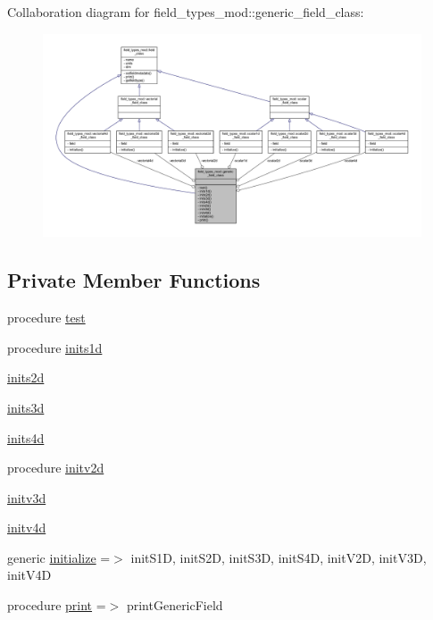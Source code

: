 Collaboration diagram for field\+\_\+types\+\_\+mod\+:\+:generic\+\_\+field\+\_\+class\+:
\nopagebreak
\begin{figure}[H]
\begin{center}
\leavevmode
\includegraphics[width=350pt]{structfield__types__mod_1_1generic__field__class__coll__graph}
\end{center}
\end{figure}
\subsection*{Private Member Functions}
\begin{DoxyCompactItemize}
\item 
procedure \mbox{\hyperlink{structfield__types__mod_1_1generic__field__class_a1b14630d6dd71ef2baf38ba633aac892}{test}}
\item 
procedure \mbox{\hyperlink{structfield__types__mod_1_1generic__field__class_a967be57b1342ca6ebd74b9b5227f893a}{inits1d}}
\item 
\mbox{\hyperlink{structfield__types__mod_1_1generic__field__class_ac18a3be56bfc8e3ea62e1dc22f523047}{inits2d}}
\item 
\mbox{\hyperlink{structfield__types__mod_1_1generic__field__class_ac97e0b49d05017b71d103b0fd38d5a30}{inits3d}}
\item 
\mbox{\hyperlink{structfield__types__mod_1_1generic__field__class_acda5aead49c8f1d2496e0ebed4b36e91}{inits4d}}
\item 
procedure \mbox{\hyperlink{structfield__types__mod_1_1generic__field__class_a98fda233bdbffdbc38f587954ffff046}{initv2d}}
\item 
\mbox{\hyperlink{structfield__types__mod_1_1generic__field__class_a9af88bc93a603945b14ded12058cfc3b}{initv3d}}
\item 
\mbox{\hyperlink{structfield__types__mod_1_1generic__field__class_a52d0285dd7ed99214a08ff3794a611b2}{initv4d}}
\item 
generic \mbox{\hyperlink{structfield__types__mod_1_1generic__field__class_ae53b0ee80d41ad66189ad515edc23a3c}{initialize}} =$>$ init\+S1D, init\+S2D, init\+S3D, init\+S4D, init\+V2D, init\+V3D, init\+V4D
\item 
procedure \mbox{\hyperlink{structfield__types__mod_1_1generic__field__class_aec2db38662ff4ee6b7dd018f60da6321}{print}} =$>$ print\+Generic\+Field
\end{DoxyCompactItemize}
